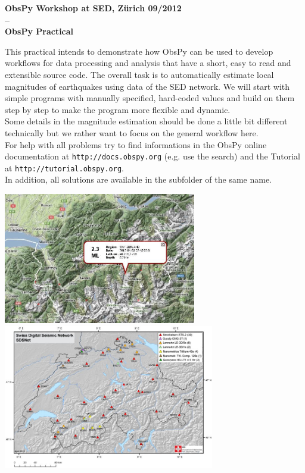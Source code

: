\documentclass{LMUexercise}
\begin{document}
%
%
%
\vspace*{1cm}
\begin{center}
\textbf{\Large ObsPy Workshop at SED, Zürich 09/2012\\ --\\ ObsPy Practical}
\end{center}
\vspace*{1.2em}
%
%
This practical intends to demonstrate how ObsPy can be used to develop
workflows for data processing and analysis that have a short, easy to read and
extensible source code. The overall task is to automatically estimate local
magnitudes of earthquakes using data of the SED network. We will start with
simple programs with manually specified, hard-coded values and build on them
step by step to make the program more flexible and dynamic.\\
Some details in the magnitude estimation should be done a little bit different
technically but we rather want to focus on the general workflow here.\\
For help with all problems try to find informations in the ObsPy online
documentation at \verb#http://docs.obspy.org# (e.g. use the search) and the
Tutorial at \verb#http://tutorial.obspy.org#.\\ In addition, all solutions are
available in the subfolder of the same name.
\vspace*{1em}

\begin{center}
\includegraphics[width=0.63\textwidth]{data/event.jpg}\\
\includegraphics[width=0.69\textwidth]{data/network_map.jpg}
\end{center}
\vspace*{1em}
\clearpage
\end{document}
